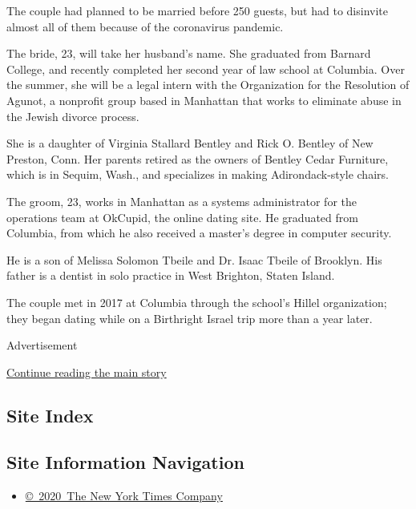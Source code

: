 The couple had planned to be married before 250 guests, but had to
disinvite almost all of them because of the coronavirus pandemic.

The bride, 23, will take her husband's name. She graduated from Barnard
College, and recently completed her second year of law school at
Columbia. Over the summer, she will be a legal intern with the
Organization for the Resolution of Agunot, a nonprofit group based in
Manhattan that works to eliminate abuse in the Jewish divorce process.

She is a daughter of Virginia Stallard Bentley and Rick O. Bentley of
New Preston, Conn. Her parents retired as the owners of Bentley Cedar
Furniture, which is in Sequim, Wash., and specializes in making
Adirondack-style chairs.

The groom, 23, works in Manhattan as a systems administrator for the
operations team at OkCupid, the online dating site. He graduated from
Columbia, from which he also received a master's degree in computer
security.

He is a son of Melissa Solomon Tbeile and Dr. Isaac Tbeile of Brooklyn.
His father is a dentist in solo practice in West Brighton, Staten
Island.

The couple met in 2017 at Columbia through the school's Hillel
organization; they began dating while on a Birthright Israel trip more
than a year later.

Advertisement

\protect\hyperlink{after-bottom}{Continue reading the main story}

\hypertarget{site-index}{%
\subsection{Site Index}\label{site-index}}

\hypertarget{site-information-navigation}{%
\subsection{Site Information
Navigation}\label{site-information-navigation}}

\begin{itemize}
\tightlist
\item
  \href{https://help.nytimes.com/hc/en-us/articles/115014792127-Copyright-notice}{©~2020~The
  New York Times Company}
\end{itemize}

